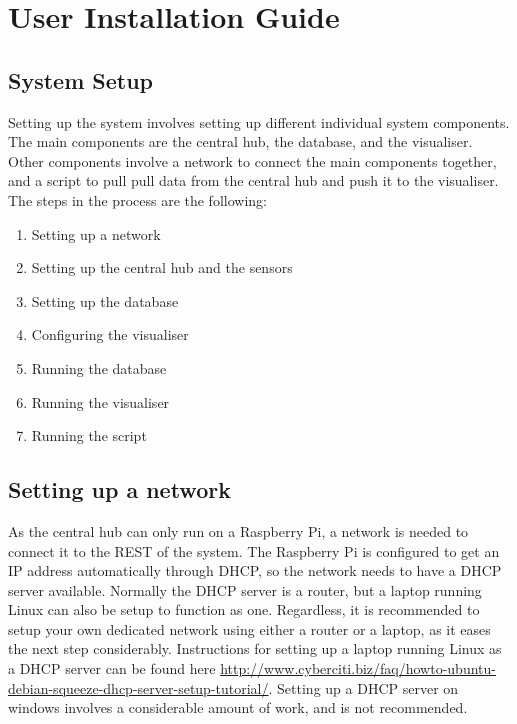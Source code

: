 \documentclass[../document.tex]{subfiles}
\begin{document}
\section{User Installation Guide}

\subsection{System Setup}
Setting up the system involves setting up different individual system components. The main components are the central hub, the database, and the visualiser. Other components involve a network to connect the main components together, and a script to pull pull data from the central hub and push it to the visualiser. The steps in the process are the following:
\begin{enumerate}
\item Setting up a network

\item Setting up the central hub and the sensors

\item Setting up the database

\item Configuring the visualiser

\item Running the database
\item Running the visualiser
\item Running the script
\end{enumerate}


\subsection{Setting up a network}
As the central hub can only run on a Raspberry Pi, a network is needed to connect it to the \gls{REST} of the system. The Raspberry Pi is configured to get an IP address automatically through DHCP, so the network needs to have a DHCP server available. Normally the DHCP server is a router, but a laptop running Linux can also be setup to function as one. Regardless, it is recommended to setup your own dedicated network using either a router or a laptop, as it eases the next step considerably. Instructions for setting up a laptop running Linux as a DHCP server can be found here \url{http://www.cyberciti.biz/faq/howto-ubuntu-debian-squeeze-dhcp-server-setup-tutorial/}.
Setting up a DHCP server on windows involves a considerable amount of work, and is not recommended.
\end{document}
